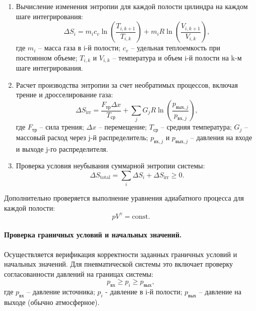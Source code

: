 \begin{enumerate}
    \item Вычисление изменения энтропии для каждой полости цилиндра на каждом шаге интегрирования:
          \begin{equation*}
              \Delta S_i = m_i c_v \ln\left(\frac{T_{i,k+1}}{T_{i,k}}\right) + m_i R \ln\left(\frac{V_{i,k+1}}{V_{i,k}}\right),
          \end{equation*}
          где $m_i$ -- масса газа в i-й полости;
          $c_v$ -- удельная теплоемкость при постоянном объеме;
          $T_{i,k}$ и $V_{i,k}$ -- температура и объем i-й полости на k-м шаге интегрирования.

    \item Расчет производства энтропии за счет необратимых процессов, включая трение и дросселирование газа:
          \begin{equation*}
              \Delta S_{\text{irr}} = \frac{F_{\text{тр}} \Delta x}{T_{\text{ср}}} + \sum_j G_j R \ln\left(\frac{p_{\text{вых},j}}{p_{\text{вх},j}}\right),
          \end{equation*}
          где $F_{\text{тр}}$ -- сила трения;
          $\Delta x$ -- перемещение;
          $T_{\text{ср}}$ -- средняя температура;
          $G_j$ -- массовый расход через j-й распределитель;
          $p_{\text{вх},j}$ и $p_{\text{вых},j}$ -- давления на входе и выходе j-го распределителя.

    \item Проверка условия неубывания суммарной энтропии системы:
          \begin{equation*}
              \Delta S_{\text{total}} = \sum_i \Delta S_i + \Delta S_{\text{irr}} \geq 0.
          \end{equation*}
\end{enumerate}

Дополнительно проверяется выполнение уравнения адиабатного процесса для каждой полости:
\begin{equation*}
    pV^{\gamma} = \text{const}.
\end{equation*}

\paragraph{Проверка граничных условий и начальных значений.}

Осуществляется верификация корректности заданных граничных условий и начальных значений.
Для пневматической системы это включает проверку согласованности давлений на границах системы:
\begin{equation*}
    p_{\text{вх}} \geq p_i \geq p_{\text{вых}},
\end{equation*}
где $p_{\text{вх}}$ -- давление источника;
$p_i$ - давление в i-й полости;
$p_{\text{вых}}$ -- давление на выходе (обычно атмосферное).


